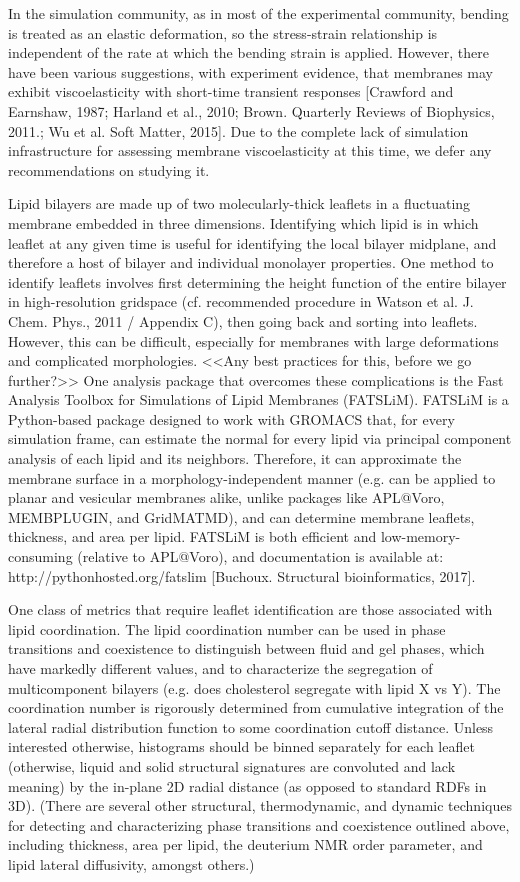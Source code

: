 \documentclass[9pt,bestpractices]{livecoms}
\begin{document}
In the simulation community, as in most of the experimental community, bending is treated as an elastic deformation, so the stress-strain relationship is independent of the rate at which the bending strain is applied.
However, there have been various suggestions, with experiment evidence, that membranes may exhibit viscoelasticity with short-time transient responses [Crawford and Earnshaw, 1987; Harland et al., 2010; Brown. Quarterly Reviews of Biophysics, 2011.; Wu et al. Soft Matter, 2015].
Due to the complete lack of simulation infrastructure for assessing membrane viscoelasticity at this time, we defer any recommendations on studying it.

Lipid bilayers are made up of two molecularly-thick leaflets in a fluctuating membrane embedded in three dimensions.
Identifying which lipid is in which leaflet at any given time is useful for identifying the local bilayer midplane, and therefore a host of bilayer and individual monolayer properties.
One method to identify leaflets involves first determining the height function of the entire bilayer in high-resolution gridspace (cf. recommended procedure in Watson et al. J. Chem. Phys., 2011 / Appendix C), then going back and sorting into leaflets.
However, this can be difficult, especially for membranes with large deformations and complicated morphologies.
<<Any best practices for this, before we go further?>>
One analysis package that overcomes these complications is the Fast Analysis Toolbox for Simulations of Lipid Membranes (FATSLiM).
FATSLiM is a Python-based package designed to work with GROMACS that, for every simulation frame, can estimate the normal for every lipid via principal component analysis of each lipid and its neighbors.
Therefore, it can approximate the membrane surface in a morphology-independent manner (e.g. can be applied to planar and vesicular membranes alike, unlike packages like APL@Voro, MEMBPLUGIN, and GridMATMD), and can determine membrane leaflets, thickness, and area per lipid.
FATSLiM is both efficient and low-memory-consuming (relative to APL@Voro), and documentation is available at: http://pythonhosted.org/fatslim [Buchoux. Structural bioinformatics, 2017].

One class of metrics that require leaflet identification are those associated with lipid coordination.
The lipid coordination number can be used in phase transitions and coexistence to distinguish between fluid and gel phases, which have markedly different values, and to characterize the segregation of multicomponent bilayers (e.g. does cholesterol segregate with lipid X vs Y).
The coordination number is rigorously determined from cumulative integration of the lateral radial distribution function to some coordination cutoff distance.
Unless interested otherwise, histograms should be binned separately for each leaflet (otherwise, liquid and solid structural signatures are convoluted and lack meaning) by the in-plane 2D radial distance (as opposed to standard RDFs in 3D).
(There are several other structural, thermodynamic, and dynamic techniques for detecting and characterizing phase transitions and coexistence outlined above, including thickness, area per lipid, the deuterium NMR order parameter, and lipid lateral diffusivity, amongst others.)
\end{document}
